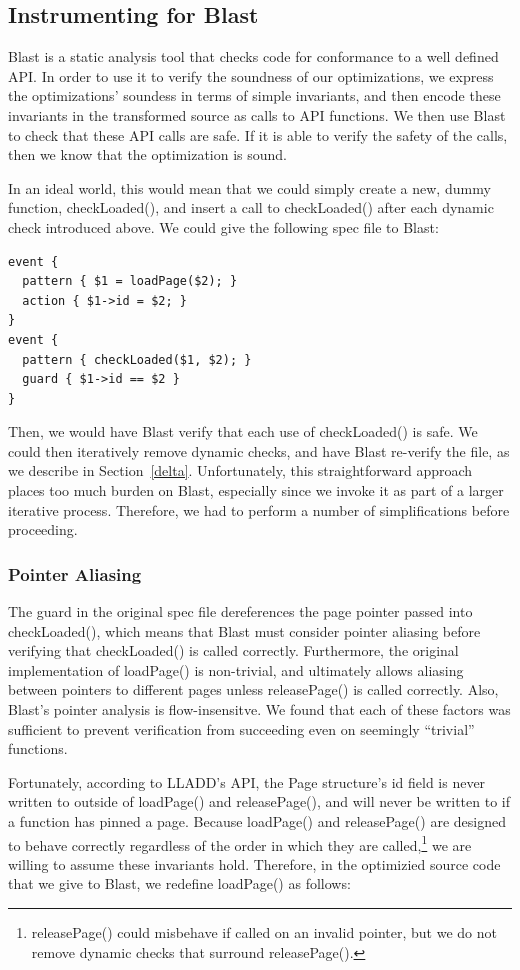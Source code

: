 \documentclass[10pt,letterpaper,twocolumn,english]{article}
\newcommand{\yad}{LLADD\xspace}
\newcommand{\pin}{loadPage()\xspace}
\newcommand{\unpin}{releasePage()\xspace}
\newcommand{\checkpage}{checkLoaded()\xspace}
\begin{document}
\subsection{Instrumenting for Blast}
\label{instrumenting}
Blast is a static analysis tool that checks code for conformance to a
well defined API.  In order to use it to verify the soundness of our
optimizations, we express the optimizations' soundess in terms of
simple invariants, and then encode these invariants in the transformed
source as calls to API functions.  We then use Blast to check that
these API calls are safe.  If it is able to verify the safety of the
calls, then we know that the optimization is sound.  

In an ideal world, this would mean that we could simply create a new,
dummy function, \checkpage, and insert a call to \checkpage
after each dynamic check introduced above.  We could give the
following spec file to Blast:

\begin{verbatim}
event { 
  pattern { $1 = loadPage($2); }
  action { $1->id = $2; }
}
event { 
  pattern { checkLoaded($1, $2); }  
  guard { $1->id == $2 }
}
\end{verbatim}

Then, we would have Blast verify that each use of \checkpage is safe.
We could then iteratively remove dynamic checks, and have Blast
re-verify the file, as we describe in Section~\ref{delta}.
Unfortunately, this straightforward approach places too much burden on
Blast, especially since we invoke it as part of a larger iterative
process.  Therefore, we had to perform a number of simplifications
before proceeding.

\subsubsection{Pointer Aliasing}

The guard in the original spec file dereferences the page pointer
passed into \checkpage, which means that Blast must consider pointer
aliasing before verifying that \checkpage is called correctly.
Furthermore, the original implementation of \pin is non-trivial, and
ultimately allows aliasing between pointers to different pages unless
\unpin is called correctly.  Also, Blast's pointer analysis is
flow-insensitve.  We found that each of these factors was sufficient
to prevent verification from succeeding even on seemingly ``trivial''
functions.  

Fortunately, according to \yad's API, the Page structure's id field is
never written to outside of \pin and \unpin, and will never be written
to if a function has pinned a page.  Because \pin and \unpin are
designed to behave correctly regardless of the order
in which they are called,\footnote{\unpin could misbehave if called on
an invalid pointer, but we do not remove dynamic checks that surround
\unpin.} we are willing to assume these invariants hold.  Therefore,
in the optimizied source code that we give to Blast, we redefine
\pin as follows:
\end{document}
